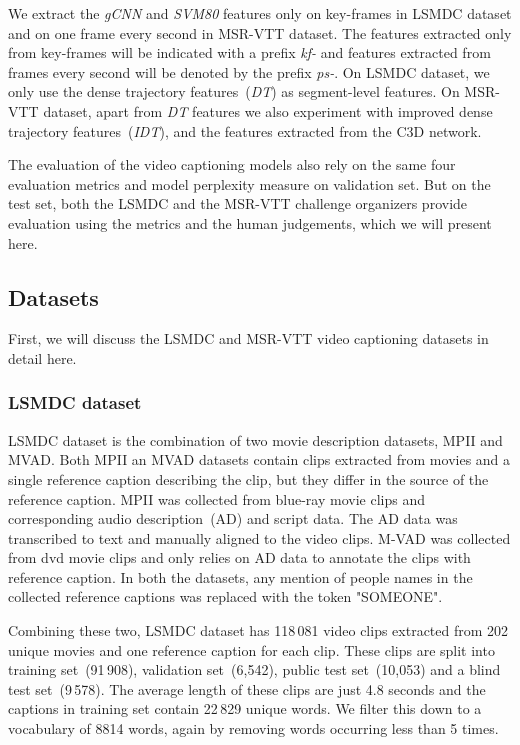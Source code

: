 We extract the \emph{gCNN} and \emph{SVM80} features only on key-frames in LSMDC
dataset and on one frame every second in MSR-VTT dataset.
The features extracted only from key-frames will be indicated with a prefix
\emph{kf-} and features extracted from frames every second will be denoted by
the prefix \emph{ps-}.
On LSMDC dataset, we only use the dense trajectory features~(\emph{DT}) as
segment-level features.
On MSR-VTT dataset, apart from \emph{DT} features we also experiment with
improved dense trajectory features~(\emph{IDT}), and the features extracted from
the C3D network.

The evaluation of the video captioning models also rely on the same four
evaluation metrics and model perplexity measure on validation set. 
But on the test set, both the LSMDC and the MSR-VTT challenge organizers provide
evaluation using the metrics and the human judgements, which we will present
here.

\subsection{Datasets}
First, we will discuss the LSMDC and MSR-VTT video captioning datasets in detail
here.
\subsubsection{LSMDC dataset}
\label{subsec:LsmdcData}
LSMDC dataset is the combination of two movie description datasets, MPII and
MVAD.
Both MPII an MVAD datasets contain clips extracted from movies and a single
reference caption describing the clip, but they differ in the source of the
reference caption.
MPII was collected from blue-ray movie clips and corresponding audio
description~(AD) and script data.
The AD data was transcribed to text and manually aligned to the video clips.
M-VAD was collected from dvd movie clips and only relies on AD data to annotate
the clips with reference caption.
In both the datasets, any mention of people names in the collected reference
captions was replaced with the token "SOMEONE".

Combining these two, LSMDC dataset has 118\,081 video clips extracted from 202
unique movies and one reference caption for each clip.
These clips are split into training set~(91\,908), validation set~(6,542), public
test set~(10,053) and a blind test set~(9\,578).
The average length of these clips are just 4.8 seconds and the captions
in training set contain 22\,829 unique words.
We filter this down to a vocabulary of 8814 words, again by removing words
occurring less than 5 times.


